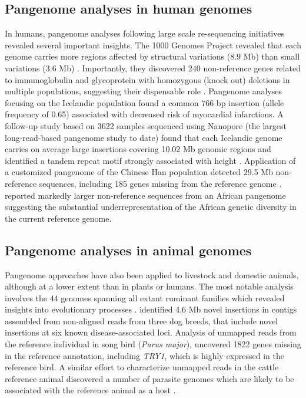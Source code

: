 \documentclass[../main.tex]{subfiles}
\begin{document}
\subsection*{Pangenome analyses in human genomes}
In humans, pangenome analyses following large scale re-sequencing initiatives revealed several important insights. The 1000 Genomes Project revealed that each genome carries more regions affected by structural variations (8.9 Mb) than small variations (3.6 Mb) \citep{10002015global}. Importantly, they discovered 240 non-reference genes related to immunoglobulin and glycoprotein with homozygous (knock out) deletions in multiple populations, suggesting their dispensable role \citep{sudmant2015integrated}. Pangenome analyses focusing on the Icelandic population \citep{kehr2017diversity} found a common 766 bp insertion (allele frequency of 0.65) associated with decreased risk of myocardial infarctions. A follow-up study based on 3622 samples sequenced using Nanopore (the largest long-read-based pangenome study to date) found that each Icelandic genome carries on average large insertions covering 10.02 Mb genomic regions and identified a tandem repeat motif strongly associated with height \citep{Beyter2021ng}. Application of a customized pangenome of the Chinese Han population detected 29.5 Mb non-reference sequences, including 185 genes missing from the reference genome \citep{duan2019hupan}. \citet{sherman2019assembly} reported markedly larger non-reference sequences from an African pangenome suggesting the substantial underrepresentation of the African genetic diversity in the current reference genome.

\subsection*{Pangenome analyses in animal genomes}
Pangenome approaches have also been applied to livestock and domestic animals, although at a lower extent than in plants or humans. The most notable analysis involves the 44 genomes spanning all extant ruminant families which revealed insights into evolutionary processes \citep{chen2019large}. \citet{holden2018assembly} identified 4.6 Mb novel insertions in contigs assembled from non-aligned reads from three dog breeds, that include  novel insertions at six known disease-associated loci. Analysis of unmapped reads from the reference individual in song bird (\emph{Parus major}), \citet{laine2019exploring} uncovered 1822 genes missing in the reference annotation, including \emph{TRY1}, which is highly expressed in the reference bird. A similar effort to characterize unmapped reads in the cattle reference animal discovered a number of parasite genomes which are likely to be associated with the reference animal as a host \citep{whitacre2015s}. 
\end{document}
